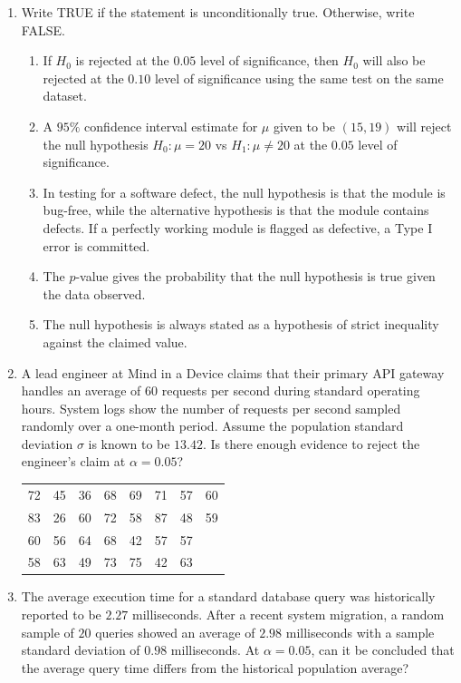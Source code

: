 \documentclass{article}
\begin{document}
\begin{enumerate}
    \item Write TRUE if the statement is unconditionally true. Otherwise, write FALSE.
    \begin{enumerate}
        \item If $H_0$ is rejected at the $0.05$ level of significance, then $H_0$ will also be rejected at the $0.10$ level of significance using the same test on the same dataset.
        \item A $95\%$ confidence interval estimate for $\mu$ given to be $(15, 19)$ will reject the null hypothesis $H_0: \mu = 20$ vs $H_1: \mu \neq 20$ at the $0.05$ level of significance.
        \item In testing for a software defect, the null hypothesis is that the module is bug-free, while the alternative hypothesis is that the module contains defects. If a perfectly working module is flagged as defective, a Type I error is committed.
        \item The $p$-value gives the probability that the null hypothesis is true given the data observed.
        \item The null hypothesis is always stated as a hypothesis of strict inequality against the claimed value.
    \end{enumerate}

    \item A lead engineer at Mind in a Device claims that their primary API gateway handles an average of $60$ requests per second during standard operating hours. System logs show the number of requests per second sampled randomly over a one-month period. Assume the population standard deviation $\sigma$ is known to be $13.42$. Is there enough evidence to reject the engineer's claim at $\alpha = 0.05$?
    \begin{table}[h]
    \centering
    \begin{tabular}{rrrrrrrr}
    72 & 45 & 36 & 68 & 69 & 71 & 57 & 60 \\
    83 & 26 & 60 & 72 & 58 & 87 & 48 & 59 \\
    60 & 56 & 64 & 68 & 42 & 57 & 57 & \\
    58 & 63 & 49 & 73 & 75 & 42 & 63 & 
    \end{tabular}
    \end{table}

    \item The average execution time for a standard database query was historically reported to be $2.27$ milliseconds. After a recent system migration, a random sample of $20$ queries showed an average of $2.98$ milliseconds with a sample standard deviation of $0.98$ milliseconds. At $\alpha = 0.05$, can it be concluded that the average query time differs from the historical population average?


\end{enumerate}
\end{document}
